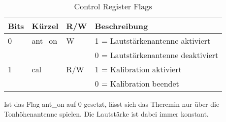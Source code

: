 \begin{table}[H]
	\centering
	\caption{Control Register Flags}
	\label{tab:Register_volume_cntrl}
	\begin{tabular}{l|l|l|l}
		\textbf{Bits} & \textbf{Kürzel} & \textbf{R/W} &	\textbf{Beschreibung}\\
		\hline \hline
		
		0 & ant\_on & W &  1 = Lautstärkenantenne aktiviert \\ 
		&      &   &  0 = Lautstärkenantenne deaktiviert \\ 
		\hline
		1 & cal & R/W &  1 = Kalibration aktiviert \\ 
		&     &     &  0 = Kalibration beendet \\ 
		\hline
	
	\end{tabular}
\end{table}

Ist das Flag ant\_on auf 0 gesetzt, lässt sich das Theremin nur über die Tonhöhenantenne spielen. Die Lautstärke ist dabei immer konstant.


